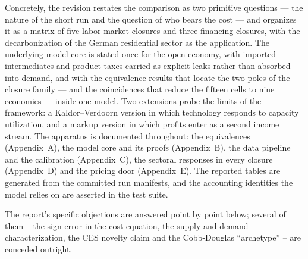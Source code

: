 {Concretely, the revision restates the comparison as two primitive questions --- the
nature of the short run and the question of who bears the cost --- and organizes it
as a matrix of five labor-market closures and three financing closures, with the
decarbonization of the German residential sector as the application. The underlying model core is stated once for the open economy, with imported intermediates and product
taxes carried as explicit leaks rather than absorbed into demand, and with the
equivalence results that locate the two poles of the closure family --- and the
coincidences that reduce the fifteen cells to nine economies --- inside one model.
Two extensions probe the limits of the framework: a Kaldor--Verdoorn version in
which technology responds to capacity utilization, and a markup version in which profits enter as a
second income stream. The apparatus is documented throughout: the equivalences
(Appendix~A), the model core and its proofs (Appendix~B), the data pipeline and the
calibration (Appendix~C), the sectoral responses in every closure (Appendix~D) and the
pricing door (Appendix~E). The reported tables are generated from the committed
run manifests, and the accounting identities the model relies on are asserted in the
test suite.

The report's specific objections are answered point by point below; several of
them -- the sign error in the cost equation, the supply-and-demand
characterization, the CES novelty claim and the Cobb-Douglas ``archetype'' --
are conceded outright.}


